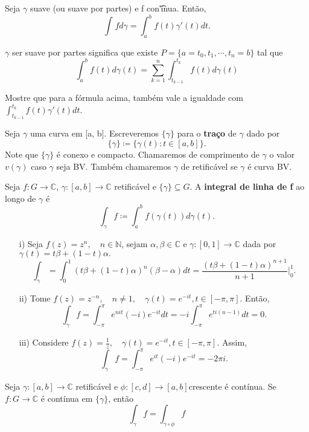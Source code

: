 \documentclass[complex.tex]{subfiles}
\begin{document}
\begin{theorem*}
	Seja $\gamma$ suave (ou suave por partes) e f con\t'inua. Então,
	$$
		\int_{}^{}f d \gamma = \int_{a}^{b}f(t)\gamma'(t)dt.
	$$
\end{theorem*}
$\gamma$ ser suave por partes significa que existe $P =\{a=t_{0}, t_1, \cdots, t_{n} = b\} $ tal que
$$
	\int_{a}^{b}f(t)d\gamma(t) = \sum\limits_{k=1}^{n}\int_{t_{k-1}}^{t_{k}}f(t)d\gamma(t)
$$
\begin{exer*}
	Mostre que para a fórmula acima, também vale a igualdade com $\int_{t_{k-1}}^{t_{k}}f(t)\gamma'(t)dt.$
\end{exer*}
\begin{def*}
	Seja $\gamma$ uma curva em [a, b]. Escreveremos $\{\gamma\} $ para o \textbf{traço} de $\gamma$ dado por
	$$
		\{\gamma\}\coloneqq  \{\gamma(t): t\in{[a, b]}\}.
	$$
	Note que $\{\gamma\} $ é conexo e compacto. Chamaremos de comprimento de $\gamma$ o valor $v(\gamma)$ caso $\gamma$ seja BV.
	Também chamaremos $\gamma$ de retificável se $\gamma$ é curva BV.
\end{def*}
\begin{def*}
	Seja $f:G\rightarrow \mathbb{C}$, $\gamma:[a, b]\rightarrow \mathbb{C}$ retificável e $\{\gamma\}\subseteq{G}.$ A \textbf{integral de
		linha de f} ao longo de $\gamma$ é
	$$
		\int_{\gamma}^{}f \coloneqq  \int_{a}^{b}f(\gamma(t))d\gamma(t).
	$$
\end{def*}
\begin{example}
	\begin{itemize}
		\item[i)] Seja $f(z) = z^n, \quad n\in{\mathbb{N}}$, sejam $\alpha, \beta\in \mathbb{C}$ e $\gamma:[0, 1]\rightarrow \mathbb{C}$
		      dada por $\gamma(t) = t \beta + (1-t)\alpha.$
		      $$
			      \int_{\gamma}^{}=\int_{0}^{1}(t\beta + (1-t)\alpha)^n(\beta - \alpha)dt = \frac{(t\beta + (1-t)\alpha)^{n+1}}{n+1}\biggl|_0^1\biggr.
		      $$
		\item[ii)] Tome $f(z) = z^{-n}, \quad n\neq1, \quad \gamma(t) = e^{-it}, t\in[-\pi, \pi].$ Então,
		      $$
			      \int_{\gamma}^{}f = \int_{-\pi}^{\pi}e^{nit}(-i)e^{-it}dt = -i \int_{-\pi}^{\pi}e^{ti(n-1)}dt = 0.
		      $$
		\item[iii)] Considere $f(z) = \frac{1}{z}, \quad \gamma(t) = e^{-it}, t\in[-\pi, \pi].$ Assim,
		      $$
			      \int_{\gamma}^{}f = \int_{-\pi}^{\pi}e^{it}(-i)e^{-it} = -2\pi i.
		      $$
	\end{itemize}
\end{example}
\begin{prop*}
	Seja $\gamma:[a, b]\rightarrow \mathbb{C}$ retificável e $\phi:[c, d]\rightarrow [a, b]$crescente é contínua. Se $f:G\rightarrow \mathbb{C}$
	é contínua em $\{\gamma\} $, então
	$$
		\int_{\gamma}^{}f = \int_{\gamma\circ{\phi}}^{}f
	$$
\end{prop*}
\end{document}
